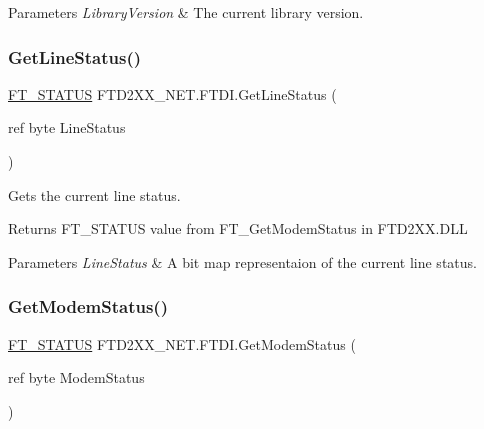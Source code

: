 \begin{DoxyParams}{Parameters}
{\em Library\+Version} & The current library version.\\
\hline
\end{DoxyParams}
\mbox{\label{class_f_t_d2_x_x___n_e_t_1_1_f_t_d_i_aa1832f81a5087fbf4fd3b1d02cd80509}} 
\subsubsection{\texorpdfstring{GetLineStatus()}{GetLineStatus()}}
{\footnotesize\ttfamily \mbox{\hyperlink{class_f_t_d2_x_x___n_e_t_1_1_f_t_d_i_aabe20ad905cc4ccc1e35dd5b877d9a83}{F\+T\+\_\+\+S\+T\+A\+T\+US}} F\+T\+D2\+X\+X\+\_\+\+N\+E\+T.\+F\+T\+D\+I.\+Get\+Line\+Status (\begin{DoxyParamCaption}\item[{ref byte}]{Line\+Status }\end{DoxyParamCaption})}



Gets the current line status. 

\begin{DoxyReturn}{Returns}
F\+T\+\_\+\+S\+T\+A\+T\+US value from F\+T\+\_\+\+Get\+Modem\+Status in F\+T\+D2\+X\+X.\+D\+LL
\end{DoxyReturn}

\begin{DoxyParams}{Parameters}
{\em Line\+Status} & A bit map representaion of the current line status.\\
\hline
\end{DoxyParams}
\mbox{\label{class_f_t_d2_x_x___n_e_t_1_1_f_t_d_i_a3315357eee0468a2a74ad35dc28c8211}} 
\subsubsection{\texorpdfstring{GetModemStatus()}{GetModemStatus()}}
{\footnotesize\ttfamily \mbox{\hyperlink{class_f_t_d2_x_x___n_e_t_1_1_f_t_d_i_aabe20ad905cc4ccc1e35dd5b877d9a83}{F\+T\+\_\+\+S\+T\+A\+T\+US}} F\+T\+D2\+X\+X\+\_\+\+N\+E\+T.\+F\+T\+D\+I.\+Get\+Modem\+Status (\begin{DoxyParamCaption}\item[{ref byte}]{Modem\+Status }\end{DoxyParamCaption})}



